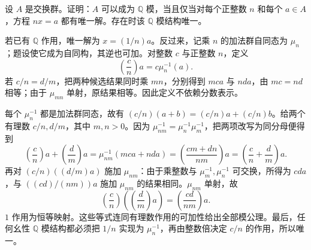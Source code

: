 \begin{exercise}\label{b2:ex:02-rational-action}
	设 \(A\) 是交换群。证明：\(A\) 可以成为 \(\mathbb Q\) 模，当且仅当对每个正整数 \(n\) 和每个 \(a\in A\)，方程 \(nx=a\) 都有唯一解。存在时该 \(\mathbb Q\) 模结构唯一。
\end{exercise}
\begin{solution}
	若已有 \(\mathbb Q\) 作用，唯一解为 \(x=(1/n)a\)。反过来，记乘 \(n\) 的加法群自同态为 \(\mu_n\)；题设使它成为自同构，其逆也可加。对整数 \(c\) 与正整数 \(n\)，定义
	\[
		\left(\dfrac cn\right)a=c\mu_n^{-1}(a).
	\]
	若 \(c/n=d/m\)，把两种候选结果同时乘 \(mn\)，分别得到 \(mc a\) 与 \(nd a\)，由 \(mc=nd\) 相等；由于 \(\mu_{mn}\) 单射，原结果相等。因此定义不依赖分数表示。

	每个 \(\mu_n^{-1}\) 都是加法群同态，故有 \((c/n)(a+b)=(c/n)a+(c/n)b\)。给两个有理数 \(c/n,d/m\)，其中 \(m,n>0\)。因为 \(\mu_{nm}^{-1}=\mu_n^{-1}\mu_m^{-1}\)，把两项改写为同分母便得到
	\[
		\left(\dfrac cn\right)a+\left(\dfrac dm\right)a =\mu_{nm}^{-1}(mc a+nd a) =\left(\dfrac{cm+dn}{nm}\right)a =\left(\dfrac cn+\dfrac dm\right)a.
	\]
	再对 \((c/n)((d/m)a)\) 施加 \(\mu_{nm}\)：由于乘整数与 \(\mu_m^{-1},\mu_n^{-1}\) 可交换，所得为 \(cd a\)，与 \(((cd)/(nm))a\) 施加 \(\mu_{nm}\) 的结果相同。\(\mu_{nm}\) 单射，故
	\[
		\left(\dfrac cn\right)\left(\left(\dfrac dm\right)a\right) =\left(\dfrac{cd}{nm}\right)a.
	\]
	\(1\) 作用为恒等映射。这些等式连同有理数作用的可加性给出全部模公理。最后，任何幺性 \(\mathbb Q\) 模结构都必须把 \(1/n\) 实现为 \(\mu_n^{-1}\)，再由整数倍决定 \(c/n\) 的作用，所以唯一。
\end{solution}

